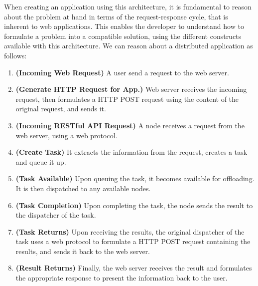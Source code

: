 \documentclass[12pt, titlepage]{uo_temp}
\begin{document}
     When creating an application using this architecture, it is fundamental to reason
     about the problem at hand in terms of the request-response cycle, that is inherent to
     web applications. This enables the developer to understand how to formulate a
     problem into a compatible solution, using the different constructs available with
     this architecture. We can reason about a distributed application as
     follows:
     \begin{enumerate}
       \item \textbf{(Incoming Web Request)} A user send a request to the web server. 
       \item \textbf{(Generate HTTP Request for App.)} Web server receives the incoming
         request, then formulates a HTTP POST request using the content of the original request,
         and sends it.
       \item \textbf{(Incoming RESTful API Request)} A node receives a request from the
         web server, using a web protocol.
       \item \textbf{(Create Task)} It extracts the information from the request, creates
         a task and queue it up.
       \item \textbf{(Task Available)} Upon queuing the task, it becomes available for
         offloading. It is then dispatched to any available nodes.
       \item \textbf{(Task Completion)} Upon completing the task, the node sends the
         result to the dispatcher of the task.
       \item \textbf{(Task Returns)} Upon receiving the results, the original dispatcher
         of the task uses a web protocol to formulate a HTTP POST request containing the
         results, and sends it back to the web server.
       \item \textbf{(Result Returns)} Finally, the web server receives the result and
         formulates the appropriate response to present the information back to the user.
     \end{enumerate}
\end{document}
